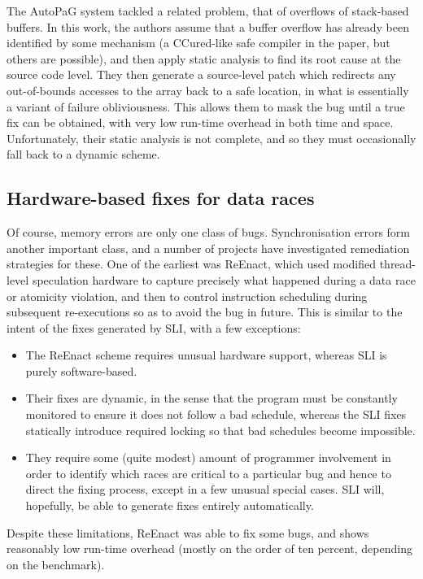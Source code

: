 The AutoPaG system\cite{Lin2007} tackled a related problem, that of
overflows of stack-based buffers.  In this work, the authors assume
that a buffer overflow has already been identified by some mechanism
(a CCured\cite{Necula2005}-like safe compiler in the paper, but others
are possible), and then apply static analysis to find its root cause
at the source code level.  They then generate a source-level patch
which redirects any out-of-bounds accesses to the array back to a safe
location, in what is essentially a variant of failure obliviousness.
This allows them to mask the bug until a true fix can be obtained,
with very low run-time overhead in both time and space.
Unfortunately, their static analysis is not complete, and so they
must occasionally fall back to a dynamic scheme.

\subsection{Hardware-based fixes for data races}
Of course, memory errors are only one class of bugs.  Synchronisation
errors form another important class, and a number of projects have
investigated remediation strategies for these.  One of the earliest
was ReEnact\cite{Prvulovic2003a}, which used modified thread-level
speculation hardware to capture precisely what happened during a data
race or atomicity violation, and then to control instruction
scheduling during subsequent re-executions so as to avoid the bug in
future.  This is similar to the intent of the fixes generated by SLI,
with a few exceptions:

\begin{itemize}
\item The ReEnact scheme requires unusual hardware support, whereas
  SLI is purely software-based.
\item Their fixes are dynamic, in the sense that the program must be
  constantly monitored to ensure it does not follow a bad schedule,
  whereas the SLI fixes statically introduce required locking so that
  bad schedules become impossible.
\item They require some (quite modest) amount of programmer
  involvement in order to identify which races are critical to a
  particular bug and hence to direct the fixing process, except in a
  few unusual special cases.  SLI will, hopefully, be able to generate
  fixes entirely automatically.
\end{itemize}

Despite these limitations, ReEnact was able to fix some bugs, and
shows reasonably low run-time overhead (mostly on the order of ten
percent, depending on the benchmark).

